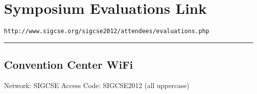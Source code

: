 {\centering
	\section*{Symposium Evaluations Link}
	\verb~http://www.sigcse.org/sigcse2012/attendees/evaluations.php~
}


\noindent\rule{5in}{0.02cm}

\begin{center}
	\section*{Convention Center WiFi}
	Network: SIGCSE Access Code:  SIGCSE2012 (all uppercase)
\end{center}
